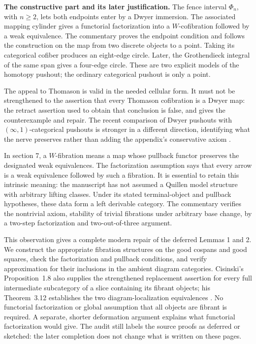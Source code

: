\medskip\noindent\textbf{The constructive part and its later justification.}
The fence interval $\Phi_n$, with $n\geq2$, lets both endpoints enter by a Dwyer immersion. The associated mapping cylinder gives a functorial factorization into a $W$-cofibration followed by a weak equivalence. The commentary proves the endpoint condition and follows the construction on the map from two discrete objects to a point. Taking its categorical cofiber produces an eight-edge circle. Later, the Grothendieck integral of the same span gives a four-edge circle. These are two explicit models of the homotopy pushout; the ordinary categorical pushout is only a point.

The appeal to Thomason is valid in the needed cellular form. It must not be strengthened to the assertion that every Thomason cofibration is a Dwyer map: the retract assertion used to obtain that conclusion is false, and \citet{Cisinski1999Dwyer} gives the counterexample and repair. The recent comparison of Dwyer pushouts with $(\infty,1)$-categorical pushouts is stronger in a different direction, identifying what the nerve preserves rather than adding the appendix's conservative axiom \citep[Theorems~1.5--1.6, arXiv v3]{HackneyOzornovaRiehlRovelli2024}.

In section 7, a $W$-fibration means a map whose pullback functor preserves the designated weak equivalences. The factorization assumption says that every arrow is a weak equivalence followed by such a fibration. It is essential to retain this intrinsic meaning: the manuscript has not assumed a Quillen model structure with arbitrary lifting classes. Under its stated terminal-object and pullback hypotheses, these data form a left derivable category. The commentary verifies the nontrivial axiom, stability of trivial fibrations under arbitrary base change, by a two-step factorization and two-out-of-three argument.

This observation gives a complete modern repair of the deferred Lemmas 1 and 2. We construct the appropriate fibration structures on the good cospans and good squares, check the factorization and pullback conditions, and verify approximation for their inclusions in the ambient diagram categories. Cisinski's Proposition~1.8 also supplies the strengthened replacement assertion for every full intermediate subcategory of a slice containing its fibrant objects; his Theorem~3.12 establishes the two diagram-localization equivalences \citep{Cisinski2010}. No functorial factorization or global assumption that all objects are fibrant is required. A separate, shorter deformation argument explains what functorial factorization would give. The audit still labels the source proofs as deferred or sketched: the later completion does not change what is written on these pages.


